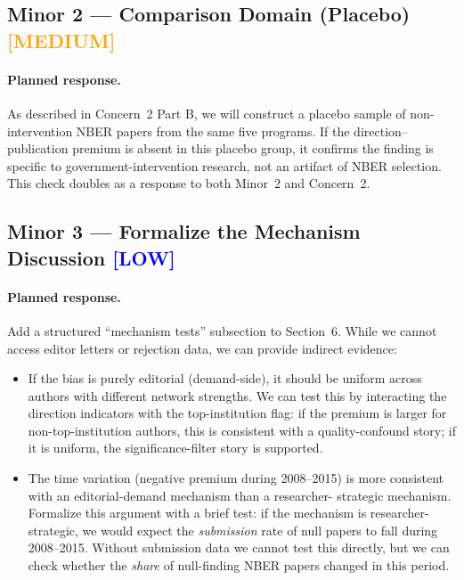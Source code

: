 \documentclass[12pt]{article}
\newcommand{\MED}{\textcolor{orange}{\textbf{[MEDIUM]}}}
\newcommand{\LOW}{\textcolor{blue}{\textbf{[LOW]}}}
\begin{document}
\subsection{Minor 2 --- Comparison Domain (Placebo) \MED}

\paragraph{Planned response.}
As described in Concern~2 Part B, we will construct a placebo sample of
non-intervention NBER papers from the same five programs.  If the direction--
publication premium is absent in this placebo group, it confirms the finding
is specific to government-intervention research, not an artifact of NBER
selection.  This check doubles as a response to both Minor~2 and
Concern~2.

\subsection{Minor 3 --- Formalize the Mechanism Discussion \LOW}

\paragraph{Planned response.}
Add a structured ``mechanism tests'' subsection to Section~6.  While we
cannot access editor letters or rejection data, we can provide indirect
evidence:

\begin{itemize}
  \item If the bias is purely editorial (demand-side), it should be uniform
        across authors with different network strengths.  We can test this by
        interacting the direction indicators with the top-institution flag:
        if the premium is larger for non-top-institution authors, this is
        consistent with a quality-confound story; if it is uniform, the
        significance-filter story is supported.

  \item The time variation (negative premium during 2008--2015) is more
        consistent with an editorial-demand mechanism than a researcher-
        strategic mechanism.  Formalize this argument with a brief test:
        if the mechanism is researcher-strategic, we would expect the
        \textit{submission} rate of null papers to fall during 2008--2015.
        Without submission data we cannot test this directly, but we can
        check whether the \textit{share} of null-finding NBER papers changed
        in this period.
\end{itemize}
\end{document}
